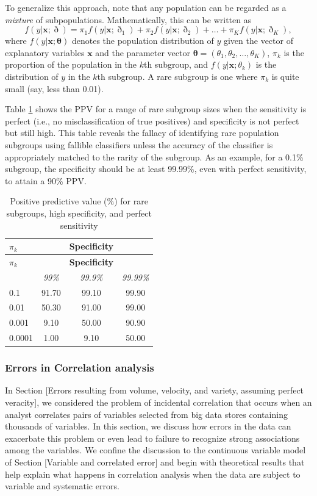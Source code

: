 \documentclass[]{krantz}
\begin{document}
To generalize this approach, note that any population can be regarded as
a \emph{mixture} of subpopulations. Mathematically, this can be written
as \[\label{eq:10-1.5}
f(y\vert \mathbf{x};{\boldsymbol \eth}) = \pi_1 f(y\vert
\mathbf{x};\eth_1 ) + \pi_2 f(y\vert \mathbf{x};\eth_2 ) +
\ldots + \pi_K f(y\vert \mathbf{x};\eth_K ),\] where
\(f(y\vert \mathbf{x}; {\boldsymbol \theta})\) denotes the population
distribution of \(y\) given the vector of explanatory variables
\(\mathbf{x}\) and the parameter vector
\({\boldsymbol \theta } = (\theta_1 ,\theta_2, \ldots, \theta_K )\),
\(\pi _k\) is the proportion of the population in the \(k\)th subgroup,
and \(f(y\vert \mathbf{x};\theta_k)\) is the distribution of \(y\) in
the \(k\)th subgroup. A rare subgroup is one where \(\pi_k\) is quite
small (say, less than 0.01).

Table \ref{tab:table10-1} shows the PPV for a range of rare subgroup
sizes when the sensitivity is perfect (i.e., no misclassification of
true positives) and specificity is not perfect but still high. This
table reveals the fallacy of identifying rare population subgroups using
fallible classifiers unless the accuracy of the classifier is
appropriately matched to the rarity of the subgroup. As an example, for
a 0.1\% subgroup, the specificity should be at least 99.99\%, even with
perfect sensitivity, to attain a 90\% PPV.

\begin{longtable}[]{@{}lccc@{}}
\caption{\label{tab:table10-1} Positive predictive value (\%) for rare
subgroups, high specificity, and perfect sensitivity}\tabularnewline
\toprule
\textbf{\(\pi_k\)} & & \textbf{Specificity} &\tabularnewline
\midrule
\endfirsthead
\toprule
\textbf{\(\pi_k\)} & & \textbf{Specificity} &\tabularnewline
\midrule
\endhead
& \emph{99\%} & \emph{99.9\%} & \emph{99.99\%}\tabularnewline
0.1 & 91.70 & 99.10 & 99.90\tabularnewline
0.01 & 50.30 & 91.00 & 99.00\tabularnewline
0.001 & 9.10 & 50.00 & 90.90\tabularnewline
0.0001 & 1.00 & 9.10 & 50.00\tabularnewline
\bottomrule
\end{longtable}

\subsubsection{Errors in Correlation analysis}\label{sec:10-4.2.4}

In Section {[}Errors resulting from volume, velocity, and variety,
assuming perfect veracity{]}, we considered the problem of incidental
correlation that occurs when an analyst correlates pairs of variables
selected from big data stores containing thousands of variables. In this
section, we discuss how errors in the data can exacerbate this problem
or even lead to failure to recognize strong associations among the
variables. We confine the discussion to the continuous variable model of
Section {[}Variable and correlated error{]} and begin with theoretical
results that help explain what happens in correlation analysis when the
data are subject to variable and systematic errors.
\end{document}
